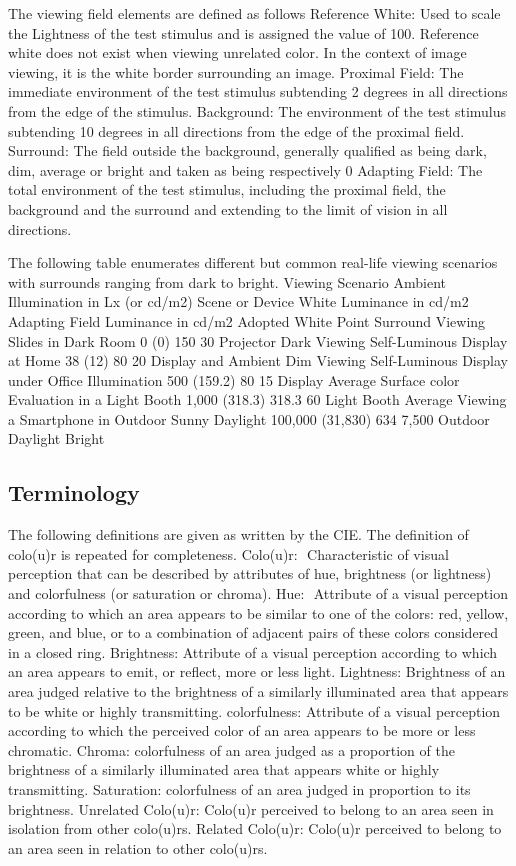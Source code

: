 The viewing field elements are defined as follows
Reference White: Used to scale the Lightness of the test stimulus and is assigned the value of 100. Reference white does not exist when viewing unrelated color. In the context of image viewing, it is the white border surrounding an image.
Proximal Field: The immediate environment of the test stimulus subtending 2 degrees in all directions from the edge of the stimulus.
Background: The environment of the test stimulus subtending 10 degrees in all directions from the edge of the proximal field.
Surround: The field outside the background, generally qualified as being dark, dim, average or bright and taken as being respectively 0%
Adapting Field: The total environment of the test stimulus, including the proximal field, the background and the surround and extending to the limit of vision in all directions.

The following table enumerates different but common real-life viewing scenarios with surrounds ranging from dark to bright.
Viewing Scenario
Ambient Illumination in Lx (or cd/m2)
Scene or Device White Luminance in cd/m2
Adapting Field Luminance in cd/m2
Adopted White Point
Surround
Viewing Slides in Dark Room
0 (0)
150
30
Projector
Dark
Viewing Self-Luminous Display at Home
38 (12)
80
20
Display
and
Ambient
Dim
Viewing Self-Luminous Display under Office Illumination
500 (159.2)
80
15
Display
Average
Surface color Evaluation in a Light Booth
1,000 (318.3)
318.3
60
Light Booth
Average
Viewing a Smartphone in Outdoor Sunny Daylight
100,000 (31,830)
 634
7,500
Outdoor Daylight
Bright

\subsection{Terminology}

The following definitions are given as written by the CIE. The definition of colo(u)r is repeated for completeness.
Colo(u)r:  Characteristic of visual perception that can be described by attributes of hue, brightness (or lightness) and colorfulness (or saturation or chroma).
Hue:  Attribute of a visual perception according to which an area appears to be similar to one of the colors: red, yellow, green, and blue, or to a combination of adjacent pairs of these colors considered in a closed ring.
Brightness: Attribute of a visual perception according to which an area appears to emit, or reflect, more or less light.
Lightness: Brightness of an area judged relative to the brightness of a similarly illuminated area that appears to be white or highly transmitting.
colorfulness: Attribute of a visual perception according to which the perceived color of an area appears to be more or less chromatic.
Chroma: colorfulness of an area judged as a proportion of the brightness of a similarly illuminated area that appears white or highly transmitting.
Saturation: colorfulness of an area judged in proportion to its brightness.
Unrelated Colo(u)r: Colo(u)r perceived to belong to an area seen in isolation from other colo(u)rs.
Related Colo(u)r: Colo(u)r perceived to belong to an area seen in relation to other colo(u)rs.

